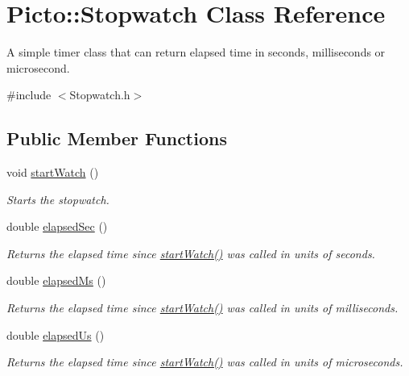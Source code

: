 \hypertarget{class_picto_1_1_stopwatch}{\section{Picto\-:\-:Stopwatch Class Reference}
\label{class_picto_1_1_stopwatch}
}


A simple timer class that can return elapsed time in seconds, milliseconds or microsecond.  




{\ttfamily \#include $<$Stopwatch.\-h$>$}

\subsection*{Public Member Functions}
\begin{DoxyCompactItemize}
\item 
void \hyperlink{class_picto_1_1_stopwatch_a273a701ce01dc1f6b51f10d03ced6ee0}{start\-Watch} ()
\begin{DoxyCompactList}\small\item\em Starts the stopwatch. \end{DoxyCompactList}\item 
\hypertarget{class_picto_1_1_stopwatch_a030cfa07068ce5068bd5d34cd79d9a7e}{double \hyperlink{class_picto_1_1_stopwatch_a030cfa07068ce5068bd5d34cd79d9a7e}{elapsed\-Sec} ()}\label{class_picto_1_1_stopwatch_a030cfa07068ce5068bd5d34cd79d9a7e}

\begin{DoxyCompactList}\small\item\em Returns the elapsed time since \hyperlink{class_picto_1_1_stopwatch_a273a701ce01dc1f6b51f10d03ced6ee0}{start\-Watch()} was called in units of seconds. \end{DoxyCompactList}\item 
\hypertarget{class_picto_1_1_stopwatch_ad37de9601018587e08ee1b80cc2c3680}{double \hyperlink{class_picto_1_1_stopwatch_ad37de9601018587e08ee1b80cc2c3680}{elapsed\-Ms} ()}\label{class_picto_1_1_stopwatch_ad37de9601018587e08ee1b80cc2c3680}

\begin{DoxyCompactList}\small\item\em Returns the elapsed time since \hyperlink{class_picto_1_1_stopwatch_a273a701ce01dc1f6b51f10d03ced6ee0}{start\-Watch()} was called in units of milliseconds. \end{DoxyCompactList}\item 
\hypertarget{class_picto_1_1_stopwatch_a2d759749b8b269e10c9f4c28aa8e5ad7}{double \hyperlink{class_picto_1_1_stopwatch_a2d759749b8b269e10c9f4c28aa8e5ad7}{elapsed\-Us} ()}\label{class_picto_1_1_stopwatch_a2d759749b8b269e10c9f4c28aa8e5ad7}

\begin{DoxyCompactList}\small\item\em Returns the elapsed time since \hyperlink{class_picto_1_1_stopwatch_a273a701ce01dc1f6b51f10d03ced6ee0}{start\-Watch()} was called in units of microseconds. \end{DoxyCompactList}\end{DoxyCompactItemize}


